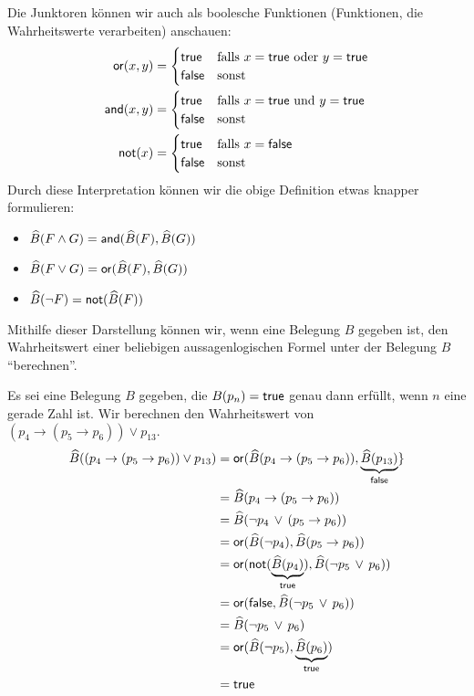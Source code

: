 \begin{rk}
    Die Junktoren können wir auch als boolesche Funktionen (Funktionen, die
    Wahrheitswerte verarbeiten) anschauen:
\begin{align*}
\mathsf{or}(x,y) &= \begin{cases}
\mathsf{true}&\text{falls }x=\mathsf{true}\text{ oder }y=\mathsf{true}\\
\mathsf{false}&\text{sonst}
\end{cases}\\
\mathsf{and}(x,y) &= \begin{cases}
\mathsf{true}&\text{falls }x=\mathsf{true}\text{ und }y=\mathsf{true}\\
\mathsf{false}&\text{sonst}
\end{cases}\\
\mathsf{not}(x) &=\begin{cases}
\mathsf{true}&\text{falls }x=\mathsf{false}\\
\mathsf{false}&\text{sonst}
\end{cases}
\end{align*}
Durch diese Interpretation können wir die obige Definition etwas knapper formulieren:
\begin{itemize}
\item $\widehat{B}(F\land G)=\mathsf{and}(\widehat{B}(F),\widehat{B}(G))$
\item $\widehat{B}(F\lor G)=\mathsf{or}(\widehat{B}(F),\widehat{B}(G))$
\item $\widehat{B}(\neg F)=\mathsf{not}(\widehat{B}(F))$
\end{itemize}
Mithilfe dieser Darstellung können wir, wenn eine Belegung $B$ gegeben ist, den Wahrheitswert einer beliebigen aussagenlogischen Formel unter der Belegung $B$ ``berechnen''.
\end{rk}


\begin{bsp}
Es sei eine Belegung $B$ gegeben, die $B(p_n)=\mathsf{true}$ genau dann erfüllt, wenn $n$ eine
gerade Zahl ist. Wir berechnen den Wahrheitswert von $(p_4\to(p_5\to p_6))\lor p_{13}.$
\begin{align*}
\widehat{B}((p_4\to(p_5\to p_6))\lor p_{13})&=\mathsf{or}(\widehat{B}(p_4\to(p_5\to p_6)),
\underbrace{\widehat{B}(p_{13})}_{\mathsf{false}}\}\\
&=\widehat{B}(p_4\to(p_5\to p_6))\\
&=\widehat{B}(\neg p_4\,\lor\,(p_5\to p_6))\\
&=\mathsf{or}(\widehat{B}(\neg p_4),\widehat{B}(p_5\to p_6))\\
&=\mathsf{or}( \mathsf{not}(\underbrace{\widehat{B}( p_4)}_{\mathsf{true}}),\widehat{B}(\neg p_5\,\lor\,
p_6))\\
&=\mathsf{or}( \mathsf{false},\widehat{B}(\neg p_5\,\lor\,
p_6))\\
&=\widehat{B}(\neg p_5\,\lor\, p_6)\\
&=\mathsf{or}(\widehat{B}(\neg p_5),\underbrace{\widehat{B}(p_6)}_{\mathsf{true}})\\
&=\mathsf{true}
\end{align*}
\end{bsp}

